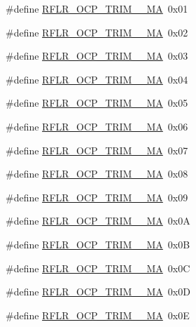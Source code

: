 \begin{DoxyCompactItemize}
\item 
\#define \hyperlink{sx1276Regs-LoRa_8h_a102d3235b329da485a39882b6f06fec4}{R\+F\+L\+R\+\_\+\+O\+C\+P\+\_\+\+T\+R\+I\+M\+\_\+\_\+\+MA}~0x01
\item 
\#define \hyperlink{sx1276Regs-LoRa_8h_a916a524ad394506a119ea2c5d8d2642c}{R\+F\+L\+R\+\_\+\+O\+C\+P\+\_\+\+T\+R\+I\+M\+\_\+\_\+\+MA}~0x02
\item 
\#define \hyperlink{sx1276Regs-LoRa_8h_a7fc3cb1a990f3c479cf620772593991b}{R\+F\+L\+R\+\_\+\+O\+C\+P\+\_\+\+T\+R\+I\+M\+\_\+\_\+\+MA}~0x03
\item 
\#define \hyperlink{sx1276Regs-LoRa_8h_a1d7e9642b9adfb481f9696186a068db8}{R\+F\+L\+R\+\_\+\+O\+C\+P\+\_\+\+T\+R\+I\+M\+\_\+\_\+\+MA}~0x04
\item 
\#define \hyperlink{sx1276Regs-LoRa_8h_a08ffd9de8d0ea7320df82bf3ddd38430}{R\+F\+L\+R\+\_\+\+O\+C\+P\+\_\+\+T\+R\+I\+M\+\_\+\_\+\+MA}~0x05
\item 
\#define \hyperlink{sx1276Regs-LoRa_8h_add96158d00533ceefc7b0ab356e4a6cc}{R\+F\+L\+R\+\_\+\+O\+C\+P\+\_\+\+T\+R\+I\+M\+\_\+\_\+\+MA}~0x06
\item 
\#define \hyperlink{sx1276Regs-LoRa_8h_a2551f7eacef1961881b7b38c724b393b}{R\+F\+L\+R\+\_\+\+O\+C\+P\+\_\+\+T\+R\+I\+M\+\_\+\_\+\+MA}~0x07
\item 
\#define \hyperlink{sx1276Regs-LoRa_8h_a944d696fcf109d939378d53b4f85f9fb}{R\+F\+L\+R\+\_\+\+O\+C\+P\+\_\+\+T\+R\+I\+M\+\_\+\_\+\+MA}~0x08
\item 
\#define \hyperlink{sx1276Regs-LoRa_8h_a4928b1121ada662258df2b1741f8f6ea}{R\+F\+L\+R\+\_\+\+O\+C\+P\+\_\+\+T\+R\+I\+M\+\_\+\_\+\+MA}~0x09
\item 
\#define \hyperlink{sx1276Regs-LoRa_8h_a701a4cf9ac291205389f408f2a37755b}{R\+F\+L\+R\+\_\+\+O\+C\+P\+\_\+\+T\+R\+I\+M\+\_\+\_\+\+MA}~0x0A
\item 
\#define \hyperlink{sx1276Regs-LoRa_8h_a9dde9ac43efb12556edd486e76ceec63}{R\+F\+L\+R\+\_\+\+O\+C\+P\+\_\+\+T\+R\+I\+M\+\_\+\_\+\+MA}~0x0B
\item 
\#define \hyperlink{sx1276Regs-LoRa_8h_afe5f0e6dfa00877d42470d27df2cf3ad}{R\+F\+L\+R\+\_\+\+O\+C\+P\+\_\+\+T\+R\+I\+M\+\_\+\_\+\+MA}~0x0C
\item 
\#define \hyperlink{sx1276Regs-LoRa_8h_a8e37fe5976b5ec9bc44a3b2af08924b6}{R\+F\+L\+R\+\_\+\+O\+C\+P\+\_\+\+T\+R\+I\+M\+\_\+\_\+\+MA}~0x0D
\item 
\#define \hyperlink{sx1276Regs-LoRa_8h_afaa7abafc08d83bcb214bf99ca93ee7c}{R\+F\+L\+R\+\_\+\+O\+C\+P\+\_\+\+T\+R\+I\+M\+\_\+\_\+\+MA}~0x0E

\end{DoxyCompactItemize}
